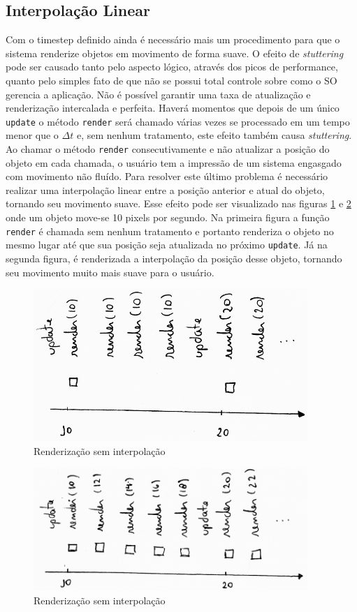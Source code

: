 \documentclass[12pt, 
openright, 
oneside, 
a4paper,    
brazil]{facom-ufu-abntex2}
\begin{document}
\subsection{Interpolação Linear} 
\label{subsec:interpoLinear}
Com o timestep definido ainda é necessário mais um procedimento para que o sistema renderize objetos em movimento de forma suave. O efeito de \textit{stuttering} pode ser causado tanto pelo aspecto lógico, através dos picos de performance, quanto pelo simples fato de que não se possui total controle sobre como o SO gerencia a aplicação. Não é possível garantir uma taxa de atualização e renderização intercalada e perfeita. Haverá momentos que depois de um único \texttt{update} o método \texttt{render} será chamado várias vezes se processado em um tempo menor que o $\Delta t$ e, sem nenhum tratamento, este efeito também causa \textit{stuttering}. Ao chamar o método \texttt{render} consecutivamente e não atualizar a posição do objeto em cada chamada, o usuário tem a impressão de um sistema engasgado com movimento não fluído.
Para resolver este último problema é necessário realizar uma interpolação linear entre a posição anterior e atual do objeto, tornando seu movimento suave. Esse efeito pode ser visualizado nas figuras \ref{fig:renderSemInterpolacao} e \ref{fig:renderComInterpolacao} onde um objeto move-se 10 pixels por segundo. Na primeira figura a função \texttt{render} é chamada sem nenhum tratamento e portanto renderiza o objeto no mesmo lugar até que sua posição seja atualizada no próximo \texttt{update}. Já na segunda figura, é renderizada a interpolação da posição desse objeto, tornando seu movimento muito mais suave para o usuário.
\begin{figure}[H]
	\centering
	\includegraphics[width=28em]{imagens/ilu7_small.png}
	\caption{Renderização sem interpolação
	\label{fig:renderSemInterpolacao}}
\end{figure}
\begin{figure}[H]
	\centering
	\includegraphics[width=28em]{imagens/ilu5_small.png}
	\caption{Renderização sem interpolação
	\label{fig:renderComInterpolacao}}
\end{figure}
\end{document}

